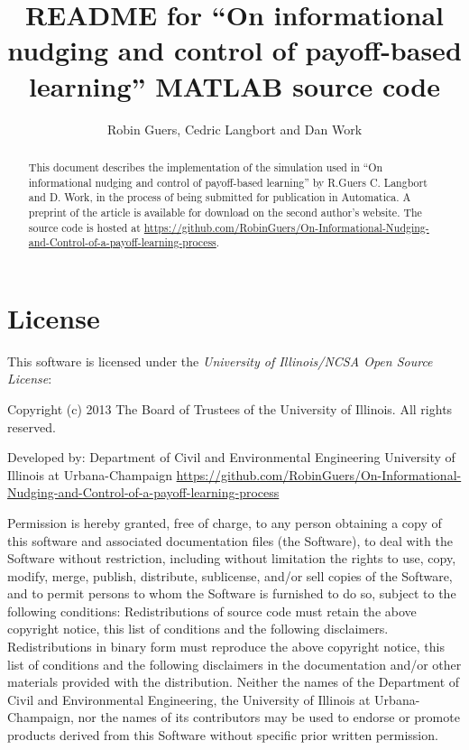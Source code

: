 \documentclass[english]{article}
\begin{document}
\title{README for ``On informational nudging and control of payoff-based learning'' MATLAB source code}


\author{Robin Guers, Cedric Langbort and Dan Work}
\maketitle
\begin{abstract}
This document describes the implementation of the simulation used in ``On informational nudging and control of payoff-based learning'' by R.Guers C. Langbort and D. Work, in the process of being submitted for publication in Automatica.
A preprint of the article is available for download on the second
author's website. The source code is hosted at \url{https://github.com/RobinGuers/On-Informational-Nudging-and-Control-of-a-payoff-learning-process}.
\end{abstract}

\section{License}

This software is licensed under the \emph{University of Illinois/NCSA
Open Source License}:

\begin{center}
Copyright (c) 2013 The Board of Trustees of the University of Illinois.
All rights reserved.
\par\end{center}

\begin{center}
Developed by: Department of Civil and Environmental Engineering University
of Illinois at Urbana-Champaign \url{https://github.com/RobinGuers/On-Informational-Nudging-and-Control-of-a-payoff-learning-process}
\par\end{center}

Permission is hereby granted, free of charge, to any person obtaining
a copy of this software and associated documentation files (the \textquotedbl{}Software\textquotedbl{}),
to deal with the Software without restriction, including without limitation
the rights to use, copy, modify, merge, publish, distribute, sublicense,
and/or sell copies of the Software, and to permit persons to whom
the Software is furnished to do so, subject to the following conditions:
Redistributions of source code must retain the above copyright notice,
this list of conditions and the following disclaimers. Redistributions
in binary form must reproduce the above copyright notice, this list
of conditions and the following disclaimers in the documentation and/or
other materials provided with the distribution. Neither the names
of the Department of Civil and Environmental Engineering, the University
of Illinois at Urbana-Champaign, nor the names of its contributors
may be used to endorse or promote products derived from this Software
without specific prior written permission.
\end{document}
